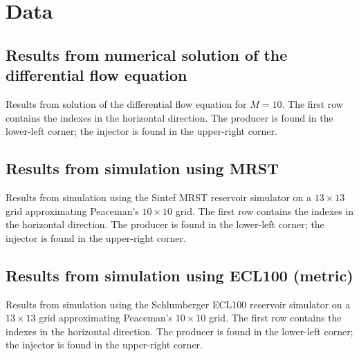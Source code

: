 
\section{Data} %
\label{sec:data}
\subsection{Results from numerical solution of the differential flow equation} %
\label{sub:results_from_numerical_solution_of_the_differential_flow_equation}
Results from solution of the differential flow equation for $M=10$. The first row contains the indexes in the horizontal direction. The producer is found in the lower-left corner; the injector is found in the upper-right corner.

{\tiny
\vspace{.5cm}
\hspace{-1cm}
}

\subsection{Results from simulation using MRST} %
\label{sub:results_from_simulation_using_mrst}
Results from simulation using the Sintef MRST reservoir simulator on a $13\times 13$ grid approximating Peaceman's $10\times 10$ grid. The first row contains the indexes in the horizontal direction. The producer is found in the lower-left corner; the injector is found in the upper-right corner.

{\tiny
\vspace{.5cm}
\hspace{-1cm}
}

\subsection{Results from simulation using ECL100 (metric)} %
\label{sub:results_from_simulation_using_ecl100_metric}
Results from simulation using the Schlumberger ECL100 reservoir simulator on a $13\times 13$ grid approximating Peaceman's $10\times 10$ grid. The first row contains the indexes in the horizontal direction. The producer is found in the lower-left corner; the injector is found in the upper-right corner.

{\tiny
\vspace{.5cm}
\hspace{-1cm}
}

